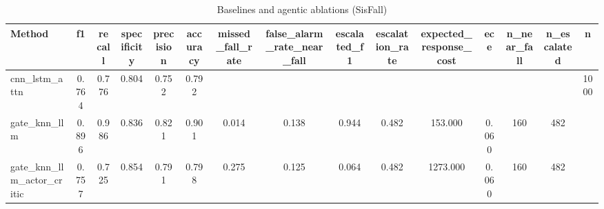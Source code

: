 \begin{table}[t]
\centering
\caption{Baselines and agentic ablations (SisFall)}
\begin{tabular}{lcccccccccccccc}
\toprule
Method & f1 & recall & specificity & precision & accuracy & missed_fall_rate & false_alarm_rate_near_fall & escalated_f1 & escalation_rate & expected_response_cost & ece & n_near_fall & n_escalated & n \\
\midrule
cnn_lstm_attn & 0.764 & 0.776 & 0.804 & 0.752 & 0.792 &  &  &  &  &  &  &  &  & 1000 \\
gate_knn_llm & 0.896 & 0.986 & 0.836 & 0.821 & 0.901 & 0.014 & 0.138 & 0.944 & 0.482 & 153.000 & 0.060 & 160 & 482 &  \\
gate_knn_llm_actor_critic & 0.757 & 0.725 & 0.854 & 0.791 & 0.798 & 0.275 & 0.125 & 0.064 & 0.482 & 1273.000 & 0.060 & 160 & 482 &  \\
\bottomrule
\end{tabular}
\end{table}